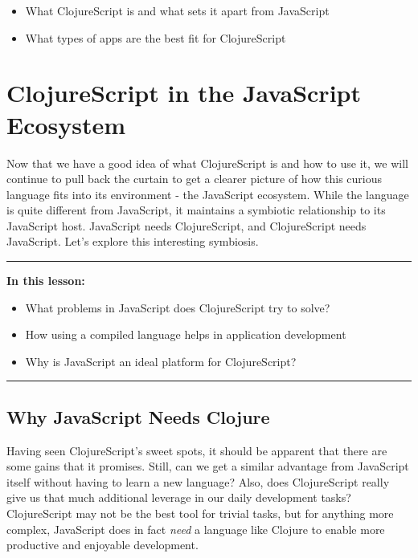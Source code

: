 \documentclass[10pt,twoside,openright]{memoir}
\begin{document}
\begin{itemize}
\tightlist
\item
  What ClojureScript is and what sets it apart from JavaScript
\item
  What types of apps are the best fit for ClojureScript
\end{itemize}


\chapter{ClojureScript in the JavaScript Ecosystem}

Now that we have a good idea of what ClojureScript is and how to use it,
we will continue to pull back the curtain to get a clearer picture of
how this curious language fits into its environment - the JavaScript
ecosystem. While the language is quite different from JavaScript, it
maintains a symbiotic relationship to its JavaScript host. JavaScript
needs ClojureScript, and ClojureScript needs JavaScript. Let's explore
this interesting symbiosis.

\begin{center}\rule{0.5\linewidth}{0.5pt}\end{center}

\textbf{In this lesson:}

\begin{itemize}
\tightlist
\item
  What problems in JavaScript does ClojureScript try to solve?
\item
  How using a compiled language helps in application development
\item
  Why is JavaScript an ideal platform for ClojureScript?
\end{itemize}

\begin{center}\rule{0.5\linewidth}{0.5pt}\end{center}

\section{Why JavaScript Needs Clojure}

Having seen ClojureScript's sweet spots, it should be apparent that
there are some gains that it promises. Still, can we get a similar
advantage from JavaScript itself without having to learn a new language?
Also, does ClojureScript really give us that much additional leverage in
our daily development tasks? ClojureScript may not be the best tool for
trivial tasks, but for anything more complex, JavaScript does in fact
\emph{need} a language like Clojure to enable more productive and
enjoyable development.
\end{document}
